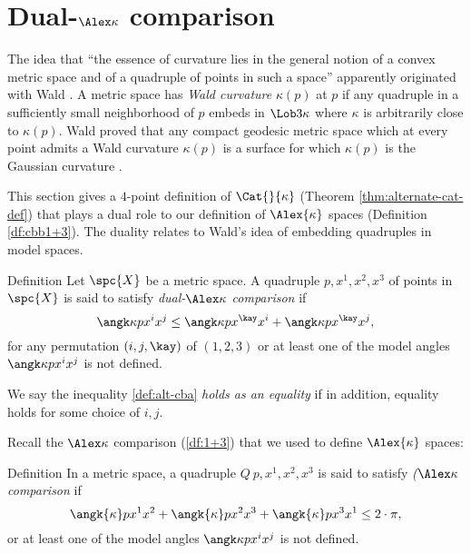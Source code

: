 
\section{Dual-$\Alex\kappa$ comparison}\label{sec:dual-1+3}



The idea that ``the essence of curvature lies in the general notion of a convex metric space and of a quadruple of points in such a space'' apparently originated with Wald \cite[p.17]{menger:wald}. A metric space has \emph{Wald curvature} $\kappa(p)$ at $p$  if  any quadruple in a sufficiently small neighborhood of $p$ embeds in $\Lob3\kappa$ where $\kappa$ is arbitrarily close to $\kappa(p)$.  Wald proved that any compact geodesic metric space which at every point admits a Wald curvature $\kappa(p)$ is a surface for which $\kappa(p)$ is the Gaussian curvature \cite{wald}. %
  
This section gives a $4$-point definition of  $\Cat{}{\kappa}$ (Theorem \ref{thm:alternate-cat-def}) that plays a dual role to our definition of $\Alex{\kappa}$ spaces (Definition \ref{df:cbb1+3}).  
The duality relates to Wald's idea of embedding quadruples in model spaces. 


\begin{thm}{Definition}\label{def:alt-cba}
Let $\spc{X}$ be a metric space.
A quadruple $p,x^1,x^2,x^3$ of points in $\spc{X}$ 
is said to satisfy \emph{dual-$\Alex\kappa$ comparison} if
\[
\angk\kappa p{x^i}{x^j}\le \angk\kappa p{x^\kay}{x^i} + \angk\kappa p{x^\kay}{x^j}, 
\]
for any permutation $(i,j,\kay)$ of $(1,2,3)$
or at least one of the model angles $\angk\kappa p{x^i}{x^j}$  is not defined.
\end{thm}

We say the inequality \ref{def:alt-cba} \emph{holds as an equality} if in addition, equality holds for some choice of $i,j$.

Recall the $\Alex\kappa$ comparison (\ref{df:1+3}) that we used to define $\Alex{\kappa}$ spaces:

\begin{thm}{Definition}\label{def:cbb} 
In a metric space, a quadruple $Q\:p,x^1,x^2,x^3$ is said to satisfy \emph{($\Alex\kappa$ comparison} if 
\[\angk{\kappa} p{x^1}{x^2}+\angk{\kappa} p{x^2}{x^3}+\angk{\kappa}p{x^3}{x^1}\le 2\cdot \pi,
\]
or at least one of the model angles $\angk\kappa p{x^i}{x^j}$  is not defined.
\end{thm}

